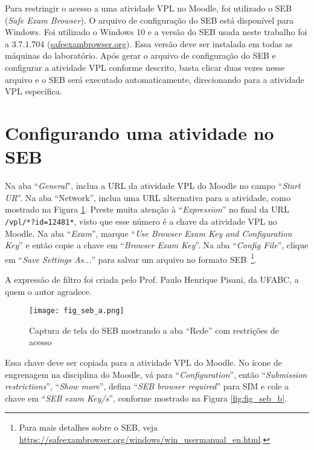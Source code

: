 \label{ch:apendiceC}

Para restringir o acesso a uma atividade VPL no Moodle, foi utilizado o SEB (\textit{Safe Exam Browser}). O arquivo de configuração do SEB está disponível para Windows. Foi utilizado o Windows 10 e a versão do SEB usada neste trabalho foi a 3.7.1.704 (\href{https://safeexambrowser.org/}{safeexambrowser.org}). Essa versão deve ser instalada em todas as máquinas do laboratório. Após gerar o arquivo de configuração do SEB e configurar a atividade VPL conforme descrito, basta clicar duas vezes nesse arquivo e o SEB será executado automaticamente, direcionando para a atividade VPL específica.

\section{Configurando uma atividade no SEB}

Na aba ``\textit{General}'', inclua a URL da atividade VPL do Moodle no campo ``\textit{Start UR}''. Na aba ``Network'', inclua uma URL alternativa para a atividade, como mostrado na Figura \ref{fig:fig_seb_a}. Preste muita atenção à ``\textit{Expression}'' no final da URL \verb|/vpl/*?id=12481*|, visto que esse número é a chave da atividade VPL no Moodle. Na aba ``\textit{Exam}'', marque ``\textit{Use Browser Exam Key and Configuration Key}'' e então copie a chave em ``\textit{Browser Exam Key}''. Na aba ``\textit{Config File}'', clique em ``\textit{Save Settings As...}'' para salvar um arquivo no formato SEB~\footnote{Para mais detalhes sobre o SEB, veja \url{https://safeexambrowser.org/windows/win_usermanual_en.html}.}.

A expressão de filtro foi criada pelo Prof. Paulo Henrique Pisani, da UFABC, a quem o autor agradece.

\begin{figure}[!ht]
\centering
\texttt{[image: fig\_seb\_a.png]}
\caption{Captura de tela do SEB mostrando a aba ``Rede'' com restrições de acesso}
\label{fig:fig_seb_a}
\end{figure}

Essa chave deve ser copiada para a atividade VPL do Moodle. No ícone de engrenagem na disciplina do Moodle, vá para ``\textit{Configuration}'', então ``\textit{Submission restrictions}'', ``\textit{Show more}'', defina ``\textit{SEB browser required}'' para SIM e cole a chave em ``\textit{SEB exam Key/s}'', conforme mostrado na Figura \ref{fig:fig_seb_b}.

